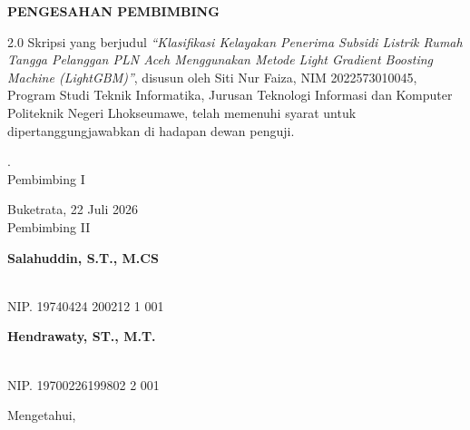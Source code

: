 \documentclass[12pt, a4paper, onecolumn, oneside]{report}
\begin{document}
\setcounter{page}{2}

\newpage
{}
{}
\begin{center}
{\fontsize{14pt}{16pt}\selectfont\bfseries PENGESAHAN PEMBIMBING}
\end{center}
\vspace{0.5cm}

\begin{spacing}{2.0}
\noindent Skripsi yang berjudul \textit{``Klasifikasi Kelayakan Penerima Subsidi Listrik Rumah Tangga Pelanggan PLN Aceh Menggunakan Metode Light Gradient Boosting Machine (LightGBM)''}, disusun oleh Siti Nur Faiza, NIM 2022573010045, Program Studi Teknik Informatika, Jurusan Teknologi Informasi dan Komputer Politeknik Negeri Lhokseumawe, telah memenuhi syarat untuk dipertanggungjawabkan di hadapan dewan penguji.
\end{spacing}

\vspace{1.5cm}

\noindent
\begin{minipage}[t]{0.48\textwidth}
\parbox[t][1cm][t]{\linewidth}{. \\
Pembimbing I}
\end{minipage}%
\begin{minipage}[t]{0.48\textwidth}
\parbox[t][1cm][t]{\linewidth}{Buketrata, 22 Juli 2026\\
Pembimbing II}
\end{minipage}

\vspace{2cm}

\noindent
\begin{minipage}[t]{0.48\textwidth}
\parbox[t][1cm][t]{\linewidth}{\bfseries Salahuddin, S.T., M.CS}\\
NIP. 19740424 200212 1 001
\end{minipage}%
\begin{minipage}[t]{0.48\textwidth}
\parbox[t][1cm][t]{\linewidth}{\bfseries Hendrawaty, ST., M.T.}\\
NIP. 19700226199802 2 001
\end{minipage}

\vspace{1.5cm}

\begin{center}
Mengetahui,
\end{center}
\end{document}
